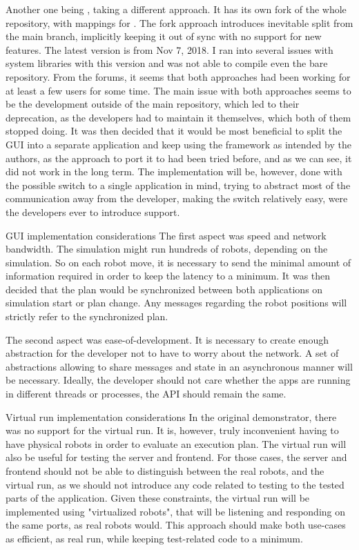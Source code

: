 Another one being {\ofnode}, taking a different approach. It has its own fork of the whole {\of} repository, with mappings for {\cmake}. The fork approach introduces inevitable split from the main branch, implicitly keeping it out of sync with no support for new features. \br
The latest version is from Nov 7, 2018. I ran into several issues with system libraries with this version and was not able to compile even the bare repository.\br\br
From the forums, it seems that both approaches had been working for at least a few users for some time. The main issue with both approaches seems to be the development outside of the main repository, which led to their deprecation, as the developers had to maintain it themselves, which both of them stopped doing.
It was then decided that it would be most beneficial to split the GUI into a separate application and keep using the framework as intended by the authors, as the approach to port it to {\cmake} had been tried before, and as we can see, it did not work in the long term.\br\br
The implementation will be, however, done with the possible switch to a single application in mind, trying to abstract most of the communication away from the developer, making the switch relatively easy, were the developers ever to introduce {\cmake} support.

\sec GUI implementation considerations
The first aspect was speed and network bandwidth. The simulation might run hundreds of robots, depending on the simulation. So on each robot move, it is necessary to send the minimal amount of information required in order to keep the latency to a minimum. 
It was then decided that the plan would be synchronized between both applications on simulation start or plan change. Any messages regarding the robot positions will strictly refer to the synchronized plan.

The second aspect was ease-of-development. It is necessary to create enough abstraction for the developer not to have to worry about the network. A set of abstractions allowing to share messages and state in an asynchronous manner will be necessary. Ideally, the developer should not care whether the apps are running in different threads or processes, the API should remain the same.

\sec Virtual run implementation considerations
In the original demonstrator, there was no support for the virtual run. It is, however, truly inconvenient having to have physical robots in order to evaluate an execution plan. The virtual run will also be useful for testing the server and frontend. For those cases, the server and frontend should not be able to distinguish between the real robots, and the virtual run, as we should not introduce any code related to testing to the tested parts of the application. Given these constraints, the virtual run will be implemented using "virtualized robots", that will be listening and responding on the same ports, as real robots would. This approach should make both use-cases as efficient, as real run, while keeping test-related code to a minimum.

